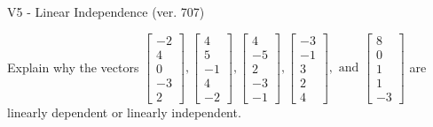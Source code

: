 \begin{exercise}
  \begin{exerciseTitle}V5 - Linear Independence (ver. 707)\end{exerciseTitle}
  \begin{exerciseStatement}
    Explain why the vectors \(\left[\begin{array}{r}
-2 \\
4 \\
0 \\
-3 \\
2
\end{array}\right] , \left[\begin{array}{r}
4 \\
5 \\
-1 \\
4 \\
-2
\end{array}\right] , \left[\begin{array}{r}
4 \\
-5 \\
2 \\
-3 \\
-1
\end{array}\right] , \left[\begin{array}{r}
-3 \\
-1 \\
3 \\
2 \\
4
\end{array}\right] , \text{ and } \left[\begin{array}{r}
8 \\
0 \\
1 \\
1 \\
-3
\end{array}\right]\) are linearly dependent or linearly independent.	



\end{exerciseStatement}
\end{exercise}
